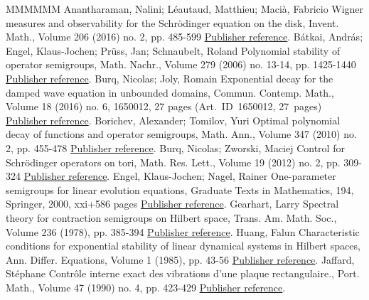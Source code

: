 \begin{thebibliography}{MMMMMM}
 Anantharaman, Nalini; Léautaud, Matthieu; Macià, Fabricio Wigner measures and observability for the Schrödinger equation on the disk, Invent. Math., Volume 206 (2016) no. 2, pp. 485-599 \href{https://ahl.centre-mersenne.org/item/AHL_2018__1__297_0/#AnantharamanLeMa16}{Publisher reference}.
 Bátkai, András; Engel, Klaus-Jochen; Prüss, Jan; Schnaubelt, Roland Polynomial stability of operator semigroups, Math. Nachr., Volume 279 (2006) no. 13-14, pp. 1425-1440 \href{https://ahl.centre-mersenne.org/item/AHL_2018__1__297_0/#BatkaiEngPruSch06}{Publisher reference}.
 Burq, Nicolas; Joly, Romain Exponential decay for the damped wave equation in unbounded domains, Commun. Contemp. Math., Volume 18 (2016) no. 6, 1650012, 27 pages (Art. ID 1650012, 27 pages) \href{https://ahl.centre-mersenne.org/item/AHL_2018__1__297_0/#BurqJo}{Publisher reference}.
 Borichev, Alexander; Tomilov, Yuri Optimal polynomial decay of functions and operator semigroups, Math. Ann., Volume 347 (2010) no. 2, pp. 455-478 \href{https://ahl.centre-mersenne.org/item/AHL_2018__1__297_0/#BorichevTo10}{Publisher reference}.
 Burq, Nicolas; Zworski, Maciej Control for Schrödinger operators on tori, Math. Res. Lett., Volume 19 (2012) no. 2, pp. 309-324 \href{https://ahl.centre-mersenne.org/item/AHL_2018__1__297_0/#BurqZwo12}{Publisher reference}.
 Engel, Klaus-Jochen; Nagel, Rainer One-parameter semigroups for linear evolution equations, Graduate Texts in Mathematics, 194, Springer, 2000, xxi+586 pages \href{https://ahl.centre-mersenne.org/item/AHL_2018__1__297_0/#engel}{Publisher reference}.
 Gearhart, Larry Spectral theory for contraction semigroups on Hilbert space, Trans. Am. Math. Soc., Volume 236 (1978), pp. 385-394 \href{https://ahl.centre-mersenne.org/item/AHL_2018__1__297_0/#Gearhart78}{Publisher reference}.
 Huang, Falun Characteristic conditions for exponential stability of linear dynamical systems in Hilbert spaces, Ann. Differ. Equations, Volume 1 (1985), pp. 43-56 \href{https://ahl.centre-mersenne.org/item/AHL_2018__1__297_0/#Huang85}{Publisher reference}.
 Jaffard, Stéphane Contrôle interne exact des vibrations d’une plaque rectangulaire., Port. Math., Volume 47 (1990) no. 4, pp. 423-429 \href{https://ahl.centre-mersenne.org/item/AHL_2018__1__297_0/#Jaffard90}{Publisher reference}.

\end{thebibliography}
